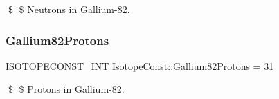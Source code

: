 \$ \$ Neutrons in Gallium-\/82. \mbox{\label{group___isotope_const-_gallium-_ga82_gafe9103b29c5fe4bb7750162cb216dc5b}} 
\subsubsection{\texorpdfstring{Gallium82\+Protons}{Gallium82Protons}}
{\footnotesize\ttfamily \mbox{\hyperlink{group___isotope_const-_macros_ga5f18360b3e99483a35c32d789e62621c}{I\+S\+O\+T\+O\+P\+E\+C\+O\+N\+S\+T\+\_\+\+I\+NT}} Isotope\+Const\+::\+Gallium82\+Protons = 31}

\$ \$ Protons in Gallium-\/82. 